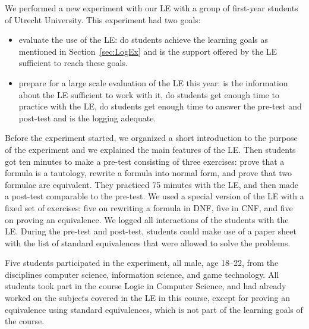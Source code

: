 \documentclass[a4paper,UKenglish]{lipics}
\begin{document}
We performed a new experiment with our LE with a group of first-year students of
Utrecht University. This experiment had two goals:
\begin{itemize}
\item evaluate the use of the LE: do students achieve the learning goals as mentioned in Section~\ref{sec:LogEx} and is the support offered by the LE sufficient to reach these goals.
\item prepare for a large scale evaluation of the LE this year: is the
information about the LE sufficient to work with it, do students get enough time
to practice with the LE, do students get enough time to answer the pre-test
and post-test and is the logging adequate.
\end{itemize}
Before the experiment started, we organized a short introduction to the purpose
of the experiment and we explained the main features of the LE. Then students
got ten minutes to make a pre-test consisting of three exercises: prove that a
formula is a tautology, rewrite a formula into normal form, and prove that two
formulae are equivalent.
They practiced 75 minutes with the LE, and then made a
post-test comparable to the pre-test. We used a special version of the LE with a
fixed set of exercises: five on rewriting a formula in DNF, five in CNF, and
five on proving an equivalence. We logged all interactions of the students with
the LE. During the pre-test and post-test, students could make use of a paper sheet 
with the list of standard equivalences that were allowed to solve the problems.



Five students participated in the experiment, all male, age 18--22, from the
disciplines computer science, information science, and game technology. All
students took part in the course Logic in Computer Science, and had already
worked on the subjects covered in the LE in this course, except for proving an
equivalence using standard equivalences, which is not part of the learning goals
of the course.
\end{document}
